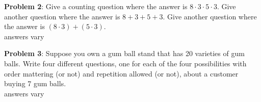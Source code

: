 \documentclass[11pt]{amsart}
\begin{document}
\pagebreak

{\bf Problem 2}: Give a counting question where the answer is $8 \cdot 3 \cdot 5 \cdot 3$. Give another question where the answer is $8 + 3 + 5 + 3$. Give another question where the answer is $(8 \cdot 3) + (5 \cdot 3)$. \\
answers vary\vfill

{\bf Problem 3}: Suppose you own a gum ball stand that has 20 varieties of gum balls.  Write four different questions, one for each of the four possibilities with order mattering (or not) and repetition allowed (or not), about a customer buying 7 gum balls.\\
answers vary\vfill
\end{document}
